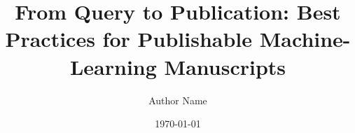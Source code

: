 \documentclass[12pt]{article}
\title{From Query to Publication: Best Practices for Publishable Machine-Learning Manuscripts}
\author{Author Name}
\date{\today}
\begin{document}
\maketitle
\doublespacing













\printbibliography
\end{document}
